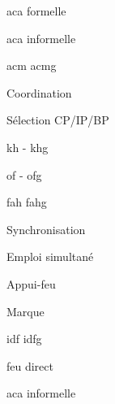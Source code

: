 \begin{e1}
\begin{e2}
\begin{e3}
\begin{e4}
				\item \gls{aca} formelle
				\item \gls{aca} informelle
			\end{e4}
		\end{e3}
		\item {} \gls{acm}\eskip{} \glsdesc{acmg}
		\item Coordination
		\begin{e3}
			\item Sélection CP/IP/BP
			\item {} \gls{kh} - \glsdesc{khg}
			\item {} \gls{of} - \glsdesc{ofg}
			\item {} \gls{fah}\eskip{} \glsdesc{fahg}
		\end{e3}
		\item Synchronisation
		\begin{e3}
			\item Emploi simultané
			\item Appui-feu
			\begin{e4}
				\item Marque
				\begin{e5}
					\item {} \gls{idf} \glsdesc{idfg}
					\item feu direct
				\end{e5}
				\item \gls{aca} informelle
			\end{e4}
		\end{e3}		
	\end{e2}
\end{e1}